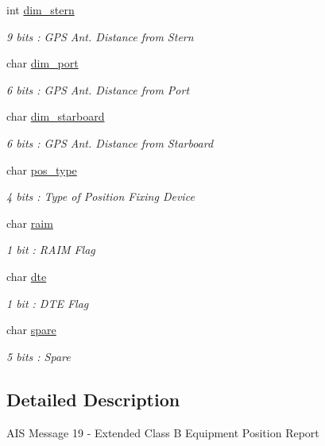 \begin{DoxyCompactItemize}
int \mbox{\hyperlink{structaismsg__19_a235be1a7e87eab6fb76d2e390b1c7446}{dim\+\_\+stern}}
\begin{DoxyCompactList}\small\item\em 9 bits \+: G\+PS Ant. Distance from Stern \end{DoxyCompactList}\item 
char \mbox{\hyperlink{structaismsg__19_a94a168ed3f3957a6e992cc987d85f993}{dim\+\_\+port}}
\begin{DoxyCompactList}\small\item\em 6 bits \+: G\+PS Ant. Distance from Port \end{DoxyCompactList}\item 
char \mbox{\hyperlink{structaismsg__19_a1a2dab0c42e2bf575e1c133cde4efd8a}{dim\+\_\+starboard}}
\begin{DoxyCompactList}\small\item\em 6 bits \+: G\+PS Ant. Distance from Starboard \end{DoxyCompactList}\item 
char \mbox{\hyperlink{structaismsg__19_a230f85c79ce09ee675801f8edfe7637d}{pos\+\_\+type}}
\begin{DoxyCompactList}\small\item\em 4 bits \+: Type of Position Fixing Device \end{DoxyCompactList}\item 
char \mbox{\hyperlink{structaismsg__19_a03139181ad6b821f6464a0a911e07e70}{raim}}
\begin{DoxyCompactList}\small\item\em 1 bit \+: R\+A\+IM Flag \end{DoxyCompactList}\item 
char \mbox{\hyperlink{structaismsg__19_a75a40ecb9ffae60f51b11ad0b491f734}{dte}}
\begin{DoxyCompactList}\small\item\em 1 bit \+: D\+TE Flag \end{DoxyCompactList}\item 
char \mbox{\hyperlink{structaismsg__19_a0c19be8325db0bc2d4c1689b0cf08c36}{spare}}
\begin{DoxyCompactList}\small\item\em 5 bits \+: Spare \end{DoxyCompactList}\end{DoxyCompactItemize}


\subsection{Detailed Description}
A\+IS Message 19 -\/ Extended Class B Equipment Position Report 

